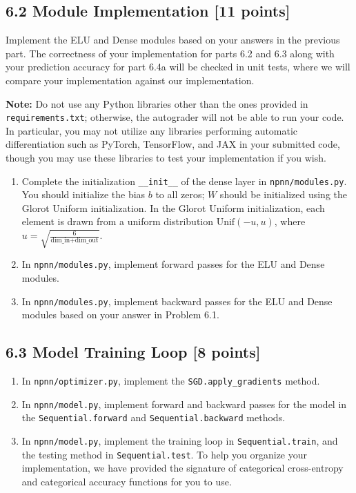\documentclass[a3paper,12pt]{extarticle} %
\begin{document}
\subsection*{6.2 Module Implementation [11 points]}
Implement the ELU and Dense modules based on your answers in the previous part. The correctness of your implementation for parts 6.2 and 6.3 along with your prediction accuracy for part 6.4a will be checked in unit tests, where we will compare your implementation against our implementation.

\textbf{Note:} Do not use any Python libraries other than the ones provided in \texttt{requirements.txt}; otherwise, the autograder will not be able to run your code. In particular, you may not utilize any libraries performing automatic differentiation such as PyTorch, TensorFlow, and JAX in your submitted code, though you may use these libraries to test your implementation if you wish.

\begin{enumerate}
    \item 
    Complete the initialization \texttt{\_\_init\_\_} of the dense layer in \texttt{npnn/modules.py}. You should initialize the bias $b$ to all zeros; $W$ should be initialized using the Glorot Uniform initialization. In the Glorot Uniform initialization, each element is drawn from a uniform distribution $\text{Unif}(-u, u)$, where $u = \sqrt{\frac{6}{\text{dim\_in} + \text{dim\_out}}}$.
    \item 
    In \texttt{npnn/modules.py}, implement forward passes for the ELU and Dense modules.
    \item In \texttt{npnn/modules.py}, implement backward passes for the ELU and Dense modules based on your answer in Problem 6.1.
\end{enumerate}

\subsection*{6.3 Model Training Loop [8 points]}
\begin{enumerate}
    \item 
    In \texttt{npnn/optimizer.py}, implement the \texttt{SGD.apply\_gradients} method.
    \item
    In \texttt{npnn/model.py}, implement forward and backward passes for the model in the \texttt{Sequential.forward} and \texttt{Sequential.backward} methods.
    \item
    In \texttt{npnn/model.py}, implement the training loop in \texttt{Sequential.train}, and the testing method in \texttt{Sequential.test}. To help you organize your implementation, we have provided the signature of categorical cross-entropy and categorical accuracy functions for you to use.
\end{enumerate}
\end{document}
